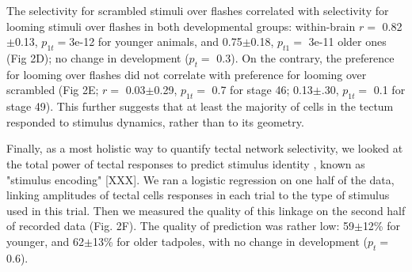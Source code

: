 \documentclass{article}
\begin{document}
The selectivity for scrambled stimuli over flashes correlated with selectivity for looming stimuli over flashes in both developmental groups: within-brain $r=$ 0.82$\pm$0.13, $p_{1t}=$3e-12 for younger animals, and 0.75$\pm$0.18, $p_{t1}=$ 3e-11 older ones (Fig 2D); no change in development ($p_t=$ 0.3). On the contrary, the preference for looming over flashes did not correlate with preference for looming over scrambled (Fig 2E; $r=$ 0.03$\pm$0.29, $p_{1t}=$ 0.7 for stage 46; 0.13$\pm$.30, $p_{1t}=$ 0.1 for stage 49). This further suggests that at least the majority of cells in the tectum responded to stimulus dynamics, rather than to its geometry.

Finally, as a most holistic way to quantify tectal network selectivity, we looked at the total power of tectal responses to predict stimulus identity \citep{avitan2016limitations}, known as "stimulus encoding" [XXX]. We ran a logistic regression on one half of the data, linking amplitudes of tectal cells responses in each trial to the type of stimulus used in this trial. Then we measured the quality of this linkage on the second half of recorded data (Fig. 2F). The quality of prediction was rather low: 59$\pm$12\% for younger, and 62$\pm$13\% for older tadpoles, with no change in development ($p_t=$ 0.6).
\end{document}
